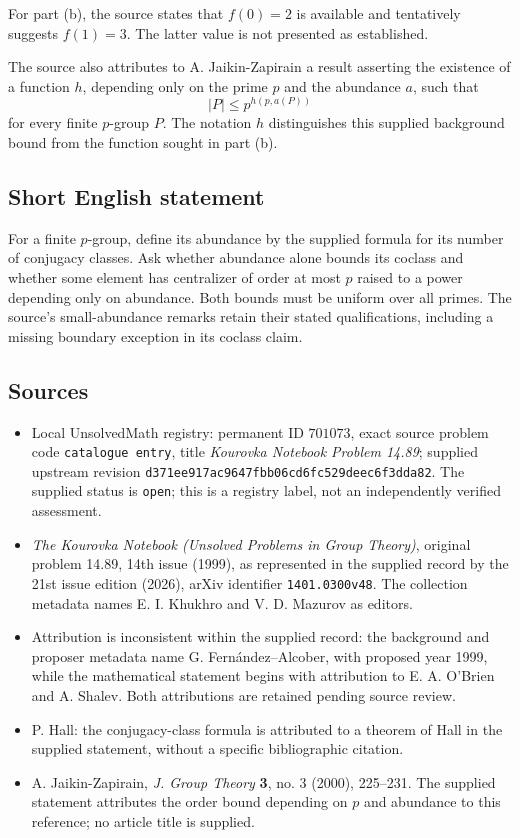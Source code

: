 \documentclass[11pt]{article}
\begin{document}
For part (b), the source states that \(f(0)=2\) is available and tentatively suggests \(f(1)=3\). The latter value is not presented as established.

The source also attributes to A. Jaikin-Zapirain a result asserting the existence of a function \(h\), depending only on the prime \(p\) and the abundance \(a\), such that
\[
|P|\leq p^{h(p,a(P))}
\]
for every finite \(p\)-group \(P\). The notation \(h\) distinguishes this supplied background bound from the function sought in part (b).
\subsection{Short English statement}
For a finite \(p\)-group, define its abundance by the supplied formula for its number of conjugacy classes. Ask whether abundance alone bounds its coclass and whether some element has centralizer of order at most \(p\) raised to a power depending only on abundance. Both bounds must be uniform over all primes. The source's small-abundance remarks retain their stated qualifications, including a missing boundary exception in its coclass claim.
\subsection{Sources}
\begin{itemize}
\item Local UnsolvedMath registry: permanent ID \(701073\), exact source problem code \texttt{catalogue entry}, title \emph{Kourovka Notebook Problem 14.89}; supplied upstream revision \texttt{d371ee917ac9647fbb06cd6fc529deec6f3dda82}. The supplied status is \texttt{open}; this is a registry label, not an independently verified assessment.
\item \emph{The Kourovka Notebook (Unsolved Problems in Group Theory)}, original problem 14.89, 14th issue (1999), as represented in the supplied record by the 21st issue edition (2026), arXiv identifier \texttt{1401.0300v48}. The collection metadata names E. I. Khukhro and V. D. Mazurov as editors.
\item Attribution is inconsistent within the supplied record: the background and proposer metadata name G. Fern\'andez--Alcober, with proposed year 1999, while the mathematical statement begins with attribution to E. A. O'Brien and A. Shalev. Both attributions are retained pending source review.
\item P. Hall: the conjugacy-class formula is attributed to a theorem of Hall in the supplied statement, without a specific bibliographic citation.
\item A. Jaikin-Zapirain, \emph{J. Group Theory} \textbf{3}, no. 3 (2000), 225--231. The supplied statement attributes the order bound depending on \(p\) and abundance to this reference; no article title is supplied.
\end{itemize}
\end{document}

